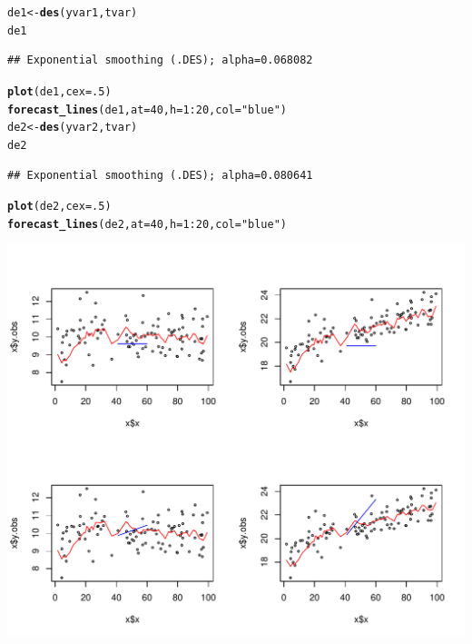 \documentclass[10pt]{article}\usepackage[]{graphicx}\usepackage[]{color}
\makeatletter
\def\maxwidth{ %
  \ifdim\Gin@nat@width>\linewidth
    \linewidth
  \else
    \Gin@nat@width
  \fi
}
\newcommand{\hlnum}[1]{\textcolor[rgb]{0.686,0.059,0.569}{#1}}%
\newcommand{\hlstr}[1]{\textcolor[rgb]{0.192,0.494,0.8}{#1}}%
\newcommand{\hlopt}[1]{\textcolor[rgb]{0,0,0}{#1}}%
\newcommand{\hlstd}[1]{\textcolor[rgb]{0.345,0.345,0.345}{#1}}%
\newcommand{\hlkwb}[1]{\textcolor[rgb]{0.69,0.353,0.396}{#1}}%
\newcommand{\hlkwc}[1]{\textcolor[rgb]{0.333,0.667,0.333}{#1}}%
\newcommand{\hlkwd}[1]{\textcolor[rgb]{0.737,0.353,0.396}{\textbf{#1}}}%
\newenvironment{kframe}{%
 \def\at@end@of@kframe{}%
 \ifinner\ifhmode%
  \def\at@end@of@kframe{\end{minipage}}%
  \begin{minipage}{\columnwidth}%
 \fi\fi%
 \def\FrameCommand##1{\hskip\@totalleftmargin \hskip-\fboxsep
 \colorbox{shadecolor}{##1}\hskip-\fboxsep
     \hskip-\linewidth \hskip-\@totalleftmargin \hskip\columnwidth}%
 \MakeFramed {\advance\hsize-\width
   \@totalleftmargin\z@ \linewidth\hsize
   \@setminipage}}%
 {\par\unskip\endMakeFramed%
 \at@end@of@kframe}
\newenvironment{knitrout}{}{} %
\makeatother
\begin{document}
\begin{knitrout}
\begin{kframe}
\begin{alltt}
\hlstd{de1}  \hlkwb{<-} \hlkwd{des}\hlstd{(yvar1, tvar)}
\hlstd{de1}
\end{alltt}
\begin{verbatim}
## Exponential smoothing (.DES); alpha=0.068082
\end{verbatim}
\begin{alltt}
\hlkwd{plot}\hlstd{(de1,} \hlkwc{cex}\hlstd{=}\hlnum{.5}\hlstd{)}
\hlkwd{forecast_lines}\hlstd{(de1,} \hlkwc{at}\hlstd{=}\hlnum{40}\hlstd{,} \hlkwc{h}\hlstd{=}\hlnum{1}\hlopt{:}\hlnum{20}\hlstd{,} \hlkwc{col}\hlstd{=}\hlstr{"blue"}\hlstd{)}
\hlstd{de2}  \hlkwb{<-} \hlkwd{des}\hlstd{(yvar2, tvar)}
\hlstd{de2}
\end{alltt}
\begin{verbatim}
## Exponential smoothing (.DES); alpha=0.080641
\end{verbatim}
\begin{alltt}
\hlkwd{plot}\hlstd{(de2,} \hlkwc{cex}\hlstd{=}\hlnum{.5}\hlstd{)}
\hlkwd{forecast_lines}\hlstd{(de2,} \hlkwc{at}\hlstd{=}\hlnum{40}\hlstd{,} \hlkwc{h}\hlstd{=}\hlnum{1}\hlopt{:}\hlnum{20}\hlstd{,} \hlkwc{col}\hlstd{=}\hlstr{"blue"}\hlstd{)}
\end{alltt}
\end{kframe}
\includegraphics[width=\maxwidth]{fig/graphunnamed-chunk-4-1} 

\end{knitrout}
\end{document}

